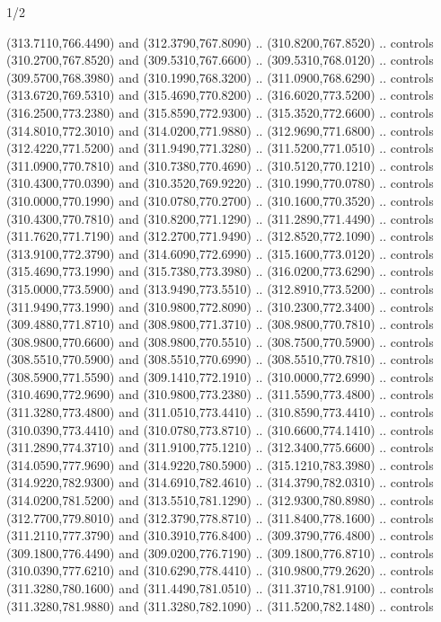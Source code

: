 \begin{flagdescription}{1/2}
\begin{scope}[xshift=0.5\flaglength]
\begin{scope}[scale=0.00745\flagwidth,xshift=-12.1mm,yshift=41.7mm]
\begin{scope}[y=0.80pt, x=0.80pt, yscale=-1, xscale=1, inner sep=0pt, outer sep=0pt]
\begin{scope}[cm={{1.33333,0.0,0.0,-1.33333,(0.0,114.66667)}}]
\begin{scope}[scale=0.100]
  (313.7110,766.4490) and (312.3790,767.8090) .. (310.8200,767.8520) .. controls
  (310.2700,767.8520) and (309.5310,767.6600) .. (309.5310,768.0120) .. controls
  (309.5700,768.3980) and (310.1990,768.3200) .. (311.0900,768.6290) .. controls
  (313.6720,769.5310) and (315.4690,770.8200) .. (316.6020,773.5200) .. controls
  (316.2500,773.2380) and (315.8590,772.9300) .. (315.3520,772.6600) .. controls
  (314.8010,772.3010) and (314.0200,771.9880) .. (312.9690,771.6800) .. controls
  (312.4220,771.5200) and (311.9490,771.3280) .. (311.5200,771.0510) .. controls
  (311.0900,770.7810) and (310.7380,770.4690) .. (310.5120,770.1210) .. controls
  (310.4300,770.0390) and (310.3520,769.9220) .. (310.1990,770.0780) .. controls
  (310.0000,770.1990) and (310.0780,770.2700) .. (310.1600,770.3520) .. controls
  (310.4300,770.7810) and (310.8200,771.1290) .. (311.2890,771.4490) .. controls
  (311.7620,771.7190) and (312.2700,771.9490) .. (312.8520,772.1090) .. controls
  (313.9100,772.3790) and (314.6090,772.6990) .. (315.1600,773.0120) .. controls
  (315.4690,773.1990) and (315.7380,773.3980) .. (316.0200,773.6290) .. controls
  (315.0000,773.5900) and (313.9490,773.5510) .. (312.8910,773.5200) .. controls
  (311.9490,773.1990) and (310.9800,772.8090) .. (310.2300,772.3400) .. controls
  (309.4880,771.8710) and (308.9800,771.3710) .. (308.9800,770.7810) .. controls
  (308.9800,770.6600) and (308.9800,770.5510) .. (308.7500,770.5900) .. controls
  (308.5510,770.5900) and (308.5510,770.6990) .. (308.5510,770.7810) .. controls
  (308.5900,771.5590) and (309.1410,772.1910) .. (310.0000,772.6990) .. controls
  (310.4690,772.9690) and (310.9800,773.2380) .. (311.5590,773.4800) .. controls
  (311.3280,773.4800) and (311.0510,773.4410) .. (310.8590,773.4410) .. controls
  (310.0390,773.4410) and (310.0780,773.8710) .. (310.6600,774.1410) .. controls
  (311.2890,774.3710) and (311.9100,775.1210) .. (312.3400,775.6600) .. controls
  (314.0590,777.9690) and (314.9220,780.5900) .. (315.1210,783.3980) .. controls
  (314.9220,782.9300) and (314.6910,782.4610) .. (314.3790,782.0310) .. controls
  (314.0200,781.5200) and (313.5510,781.1290) .. (312.9300,780.8980) .. controls
  (312.7700,779.8010) and (312.3790,778.8710) .. (311.8400,778.1600) .. controls
  (311.2110,777.3790) and (310.3910,776.8400) .. (309.3790,776.4800) .. controls
  (309.1800,776.4490) and (309.0200,776.7190) .. (309.1800,776.8710) .. controls
  (310.0390,777.6210) and (310.6290,778.4410) .. (310.9800,779.2620) .. controls
  (311.3280,780.1600) and (311.4490,781.0510) .. (311.3710,781.9100) .. controls
  (311.3280,781.9880) and (311.3280,782.1090) .. (311.5200,782.1480) .. controls

\end{scope}
\end{scope}
\end{scope}
\end{scope}
\end{scope}
\end{flagdescription}
